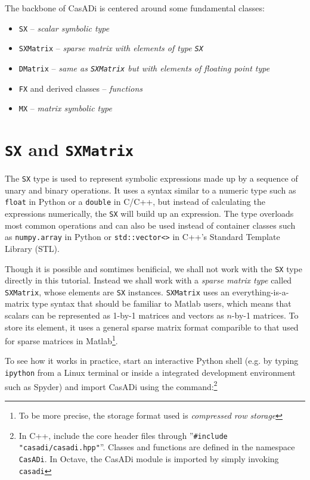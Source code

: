 \documentclass[a4paper,12pt]{book}
\begin{document}
{The backbone of CasADi is centered around some fundamental classes:
\begin{itemize}
 \item \texttt{SX} -- \emph{scalar symbolic type}
 \item \texttt{SXMatrix} -- \emph{sparse matrix with elements of type \texttt{SX}}
 \item \texttt{DMatrix}  -- \emph{same as \texttt{SXMatrix} but with elements of floating point type}
 \item \texttt{FX} and derived classes -- \emph{functions}
 \item \texttt{MX} -- \emph{matrix symbolic type}
\end{itemize}

\section{\texttt{SX} and \texttt{SXMatrix}}
The \texttt{SX} type is used to represent symbolic expressions made up by a sequence of unary and binary operations. It uses a syntax similar to a numeric type such as \texttt{float} in Python or a \texttt{double} in C/C++, but instead of calculating the expressions numerically, the \texttt{SX} will build up an expression. The type overloads most common operations and can also be used instead of container classes such as \texttt{numpy.array} in Python or \texttt{std::vector<>} in C++'s Standard Template Library (STL).

Though it is possible and somtimes benificial, we shall not work with the \texttt{SX} type directly in this tutorial. Instead we shall work with a \emph{sparse matrix type} called \texttt{SXMatrix}, whose elements are \texttt{SX} instances. \texttt{SXMatrix} uses an everything-is-a-matrix type syntax that should be familiar to Matlab users, which means that scalars can be represented as 1-by-1 matrices and vectors as $n$-by-1 matrices. To store its element, it uses a general sparse matrix format comparible to that used for sparse matrices in Matlab\footnote{To be more precise, the storage format used is \emph{compressed row storage}}.

To see how it works in practice, start an interactive Python shell (e.g. by typing \texttt{ipython} from a Linux terminal or inside a integrated development environment such as Spyder) and import CasADi using the command:\footnote{In C++, include the core header files through ''\texttt{\#include "casadi/casadi.hpp"}''. Classes and functions are defined in the namespace \texttt{CasADi}. In Octave, the CasADi module is imported by simply invoking \texttt{casadi}}

}
\end{document}
